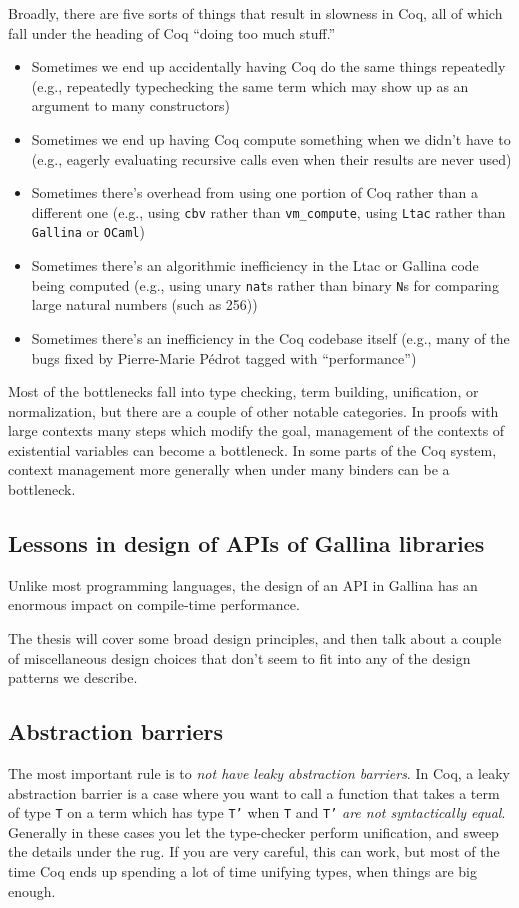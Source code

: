 \documentclass[twoside]{article}
\begin{document}
Broadly, there are five sorts of things that result in slowness in Coq, all of which fall under the heading of Coq ``doing too much stuff.''
\begin{itemize}
\item
  Sometimes we end up accidentally having Coq do the same things repeatedly (e.g., repeatedly typechecking the same term which may show up as an argument to many constructors)
\item
  Sometimes we end up having Coq compute something when we didn't have to (e.g., eagerly evaluating recursive calls even when their results are never used)
\item
  Sometimes there's overhead from using one portion of Coq rather than a different one (e.g., using \texttt{cbv} rather than \texttt{vm\_compute}, using \texttt{Ltac} rather than \texttt{Gallina} or \texttt{OCaml})
\item
  Sometimes there's an algorithmic inefficiency in the Ltac or Gallina code being computed (e.g., using unary \texttt{nat}s rather than binary \texttt{N}s for comparing large natural numbers (such as 256))
\item
  Sometimes there's an inefficiency in the Coq codebase itself (e.g., many of the bugs fixed by Pierre-Marie P\'edrot tagged with ``performance'')
\end{itemize}

Most of the bottlenecks fall into type checking, term building, unification, or normalization, but there are a couple of other notable categories.
In proofs with large contexts many steps which modify the goal, management of the contexts of existential variables can become a bottleneck.
In some parts of the Coq system, context management more generally when under many binders can be a bottleneck.

\subsection{Lessons in design of APIs of Gallina libraries}

Unlike most programming languages, the design of an API in Gallina has an enormous impact on compile-time performance.

The thesis will cover some broad design principles, and then talk about a couple of miscellaneous design choices that don't seem to fit into any of the design patterns we describe.

\subsection{Abstraction barriers}
The most important rule is to \emph{not have leaky abstraction barriers}.
In Coq, a leaky abstraction barrier is a case where you want to call a function that takes a term of type \texttt{T} on a term which has type \texttt{T'} when \texttt{T} and \texttt{T'} \emph{are not syntactically equal}.
Generally in these cases you let the type-checker perform unification, and sweep the details under the rug.
If you are very careful, this can work, but most of the time Coq ends up spending a lot of time unifying types, when things are big enough.
\end{document}
